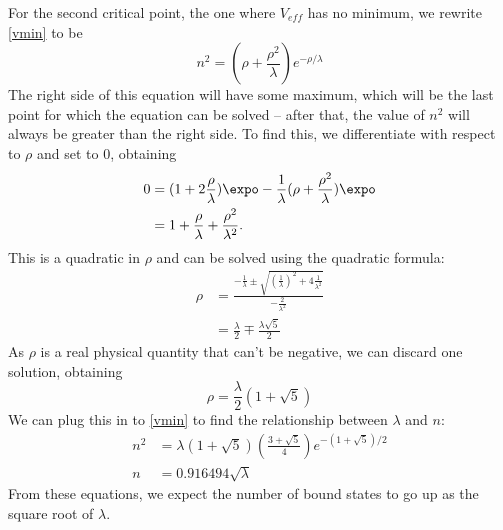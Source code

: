\documentclass[12pt,twoside]{reedthesis}
\begin{document}
For the second critical point, the one where $V_{eff}$ has no minimum, we rewrite \eqref{vmin} to be
\begin{equation}
n^2 = \left( \rho + \frac{\rho^2}{\lambda} \right) e^{-\rho/\lambda}
\end{equation}
The right side of this equation will have some maximum, which will be the last point for which the equation can be solved -- after that, the value of $n^2$ will always be greater than the right side. To find this, we differentiate with respect to $\rho$ and set to 0, obtaining
\begin{align}
0 &= (1+2\frac{\rho}{\lambda})\expo - \frac{1}{\lambda}(\rho + \frac{\rho^2}{\lambda})\expo \\
&= 1 + \frac{\rho}{\lambda} + \frac{\rho^2}{\lambda^2}\mbox{.}
\end{align}
This is a quadratic in $\rho$ and can be solved using the quadratic formula:
\begin{align}
\rho &= \frac{-\frac{1}{\lambda} \pm \sqrt{\left(\frac{1}{\lambda}\right)^2+4\frac{1}{\lambda^2}}}{-\frac{2}{\lambda^2}} \\
&= \frac{\lambda}{2} \mp \frac{\lambda \sqrt{5}}{2}
\end{align}
As $\rho$ is a real physical quantity that can't be negative, we can discard one solution, obtaining
\begin{equation}
\rho = \frac{\lambda}{2}(1+\sqrt{5})
\end{equation}
We can plug this in to \eqref{vmin} to find the relationship between $\lambda$ and $n$:
\begin{align}
n^2 &= \lambda(1+\sqrt{5})\left(\frac{3+\sqrt{5}}{4}\right)e^{-(1+\sqrt{5})/2} \\
n &= 0.916494 \sqrt{\lambda}
\end{align}
From these equations, we expect the number of bound states to go up as the square root of $\lambda$.
\end{document}
